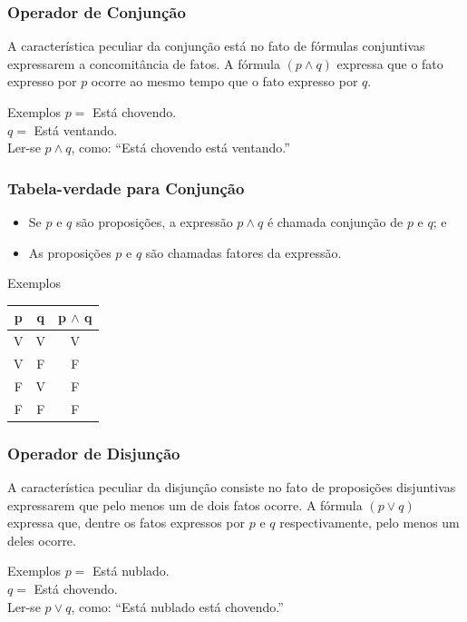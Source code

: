 \documentclass[aspectratio=169]{beamer} %
\begin{document}
\begin{frame}
\frametitle{Operador de Conjunção}

A característica peculiar da conjunção está no fato de fórmulas conjuntivas expressarem a concomitância de fatos. A fórmula $(p \wedge q)$ expressa que o
fato expresso por $p$ ocorre ao mesmo tempo que o fato expresso por $q$. \vfill

\begin{exampleblock}{Exemplos}
$p =$ Está chovendo.\\
$q =$ Está ventando.\\
Ler-se $p \wedge q$, como: ``Está chovendo  está ventando.''
\end{exampleblock}
\end{frame}

\begin{frame}
\frametitle{Tabela-verdade para Conjunção}

\begin{itemize}
\item Se $p$ e $q$ são proposições, a expressão $p \wedge q$ é chamada conjunção de $p$ e $q$; e
\item As proposições $p$ e $q$ são chamadas fatores da expressão.
\end{itemize} \vfill

\begin{exampleblock}{Exemplos}
\center
\begin{tabular}{|c|c|c|}
	\hline
	\textbf{p} & \textbf{q} & \textbf{p $\wedge$ q}\\ \hline
	V & V & V \\ \hline
	V & F & F \\ \hline
	F & V & F \\ \hline
	F & F & F \\ \hline
\end{tabular}
\end{exampleblock}
\end{frame}

\begin{frame}
\frametitle{Operador de Disjunção}

A característica peculiar da disjunção consiste no fato de proposições disjuntivas expressarem que pelo menos um de dois fatos ocorre. A fórmula $(p \vee q)$ expressa que, dentre os fatos expressos por $p$ e $q$ respectivamente,
pelo menos um deles ocorre. \vfill

\begin{exampleblock}{Exemplos}
$p =$ Está nublado.\\
$q =$ Está chovendo.\\
Ler-se $p \vee q$, como: ``Está nublado  está chovendo.''
\end{exampleblock}
\end{frame}
\end{document}
